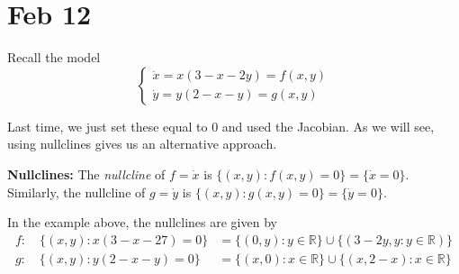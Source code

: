 \documentclass[12pt]{report}
\newcommand{\R}{\mathbb{R}}
\newcommand*{\tbf}[1]{\ifmmode\mathbf{#1}\else\textbf{#1}\fi}
\begin{document}
\section{Feb 12}

Recall the model
\[\begin{cases}
        \dot x = x(3 - x - 2y) = f(x, y) \\
        \dot y = y(2 - x - y) = g(x, y)
    \end{cases}\]

Last time, we just set these equal to $0$ and used the Jacobian. As we will see, using nullclines gives us an alternative approach.

\tbf{Nullclines:} The \emph{nullcline} of $f = \dot x$ is $\{(x, y): f(x, y) = 0\} = \{\dot x = 0\}$. Similarly, the nullcline of $g = \dot y$ is $\{(x, y): g(x, y) = 0\} = \{\dot y = 0\}$.

In the example above, the nullclines are given by
\begin{align*}
    f: \quad \{(x, y): x(3 - x - 27) = 0\} & = \{(0, y): y \in \R\} \cup \{(3 - 2y, y: y \in \R)\} \\
    g: \quad \{(x, y) : y(2 - x - y) = 0\} & = \{(x, 0): x \in \R\} \cup \{(x, 2 - x): x \in \R\}
\end{align*}
\end{document}
